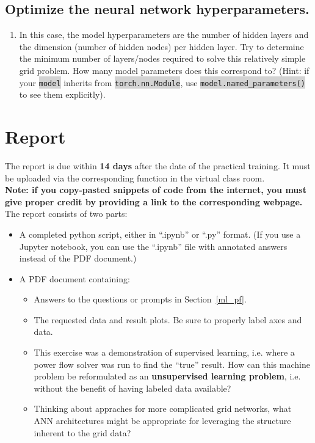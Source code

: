 \documentclass[11pt]{article}
\newcommand{\code}[1]{\colorbox{lightgray}{\texttt{#1}}}
\begin{document}
\subsection{Optimize the neural network hyperparameters.}

\begin{enumerate}
\item In this case, the model hyperparameters are the number of hidden layers and the
  dimension (number of hidden nodes) per hidden layer. Try to determine the minimum number
  of layers/nodes required to solve this relatively simple grid problem. How many model parameters
  does this correspond to? (Hint: if your \code{model} inherits from \code{torch.nn.Module}, use
  \code{model.named\_parameters()} to see them explicitly).
\end{enumerate}

\section{Report}

The report is due within \textbf{14 days} after the date of the practical training. It must be
uploaded via the corresponding function in the virtual class room.\\

{\color{red}\textbf{Note: if you copy-pasted snippets of code from the internet, you must give
    proper credit by providing a link to the corresponding webpage.}}\\

The report consists of two parts:
\begin{itemize}
\item A completed python script, either in ``.ipynb'' or ``.py'' format.
  (If you use a Jupyter notebook, you can use the ``.ipynb'' file with annotated answers instead
  of the PDF document.)
\item A PDF document containing:
  \begin{itemize}
  \item Answers to the questions or prompts in Section~\ref{ml_pf}.
  \item The requested data and result plots. Be sure to properly label axes and data.
  \item This exercise was a demonstration of supervised learning, i.e. where a power flow
    solver was run to find the ``true'' result. How can this machine problem be reformulated
    as an \textbf{unsupervised learning problem}, i.e. without the benefit of having labeled
    data available?
  \item Thinking about appraches for more complicated grid networks, what ANN architectures
    might be appropriate for leveraging the structure inherent to the grid data?
  \end{itemize}
\end{itemize}
\end{document}
